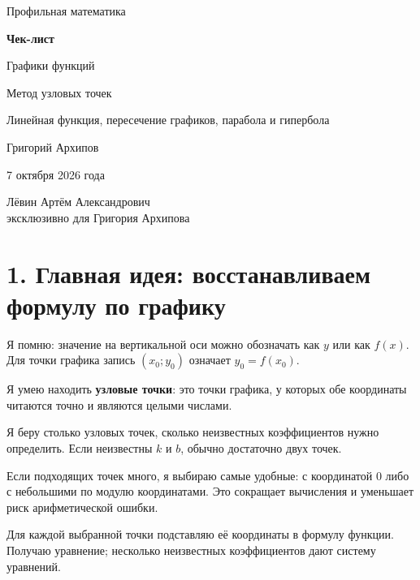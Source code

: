 \documentclass[a4paper,12pt]{article}
\newcommand{\heading}[1]{\section*{\color{darkaccent}#1}}
\newcommand{\checkitem}[1]{%
  \par\noindent
  \makebox[7mm][l]{\raisebox{0.15ex}{$\square$}}%
  \begin{minipage}[t]{\dimexpr\linewidth-7mm\relax}
    #1
  \end{minipage}\par\vspace{2mm}
}
\newcommand{\key}[1]{\textbf{\color{darkaccent}#1}}
\begin{document}
\color{textgray}
\raggedright

\hypersetup{pageanchor=false}
\begin{titlepage}
\centering
\vspace*{22mm}
{\large Профильная математика\par}
\vspace{12mm}
{\Huge\bfseries Чек-лист\par}
\vspace{8mm}
{\LARGE Графики функций\par}
\vspace{3mm}
{\Large Метод узловых точек\par}
\vspace{10mm}
{\large Линейная функция, пересечение графиков, парабола и гипербола\par}
\vspace{18mm}
{\large Григорий Архипов\par}
\vspace{5mm}
{\large 7 октября 2026 года\par}
\vfill
{\normalsize Лёвин Артём Александрович\\эксклюзивно для Григория Архипова\par}
\vspace{14mm}
\vspace*{5mm}
\end{titlepage}
\hypersetup{pageanchor=true}

\heading{1. Главная идея: восстанавливаем формулу по графику}

\checkitem{Я помню: значение на вертикальной оси можно обозначать как $y$ или как $f(x)$. Для точки графика запись $(x_0;y_0)$ означает $y_0=f(x_0)$.}

\checkitem{Я умею находить \key{узловые точки}: это точки графика, у которых обе координаты читаются точно и являются целыми числами.}

\checkitem{Я беру столько узловых точек, сколько неизвестных коэффициентов нужно определить. Если неизвестны $k$ и $b$, обычно достаточно двух точек.}

\checkitem{Если подходящих точек много, я выбираю самые удобные: с координатой $0$ либо с небольшими по модулю координатами. Это сокращает вычисления и уменьшает риск арифметической ошибки.}

\checkitem{Для каждой выбранной точки подставляю её координаты в формулу функции. Получаю уравнение; несколько неизвестных коэффициентов дают систему уравнений.}
\end{document}
